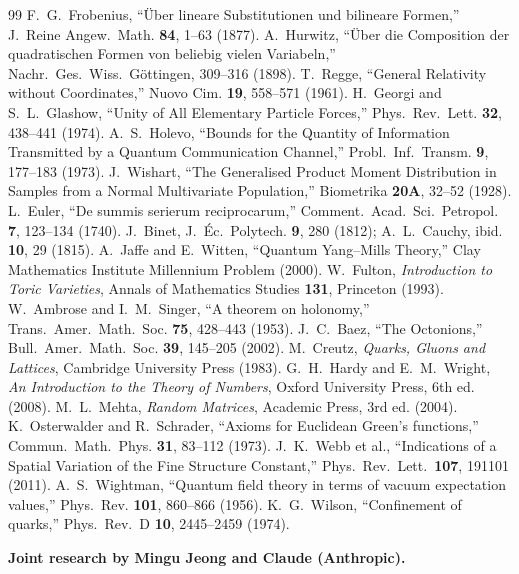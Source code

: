 \documentclass[12pt]{article}
\theoremstyle{remark}
\theoremstyle{definition}
\begin{document}





\begin{thebibliography}{99}
 F.~G.~Frobenius, ``\"Uber lineare Substitutionen und bilineare Formen,'' J.~Reine Angew.~Math. \textbf{84}, 1--63 (1877).
 A.~Hurwitz, ``\"Uber die Composition der quadratischen Formen von beliebig vielen Variabeln,'' Nachr.~Ges.~Wiss.~G\"ottingen, 309--316 (1898).
 T.~Regge, ``General Relativity without Coordinates,'' Nuovo Cim. \textbf{19}, 558--571 (1961).
 H.~Georgi and S.~L.~Glashow, ``Unity of All Elementary Particle Forces,'' Phys.~Rev.~Lett. \textbf{32}, 438--441 (1974).
 A.~S.~Holevo, ``Bounds for the Quantity of Information Transmitted by a Quantum Communication Channel,'' Probl.~Inf.~Transm. \textbf{9}, 177--183 (1973).
 J.~Wishart, ``The Generalised Product Moment Distribution in Samples from a Normal Multivariate Population,'' Biometrika \textbf{20A}, 32--52 (1928).
 L.~Euler, ``De summis serierum reciprocarum,'' Comment.~Acad.~Sci.~Petropol. \textbf{7}, 123--134 (1740).
 J.~Binet, J.~\'Ec.~Polytech. \textbf{9}, 280 (1812); A.~L.~Cauchy, ibid. \textbf{10}, 29 (1815).
 A.~Jaffe and E.~Witten, ``Quantum Yang--Mills Theory,'' Clay Mathematics Institute Millennium Problem (2000).
 W.~Fulton, \textit{Introduction to Toric Varieties}, Annals of Mathematics Studies \textbf{131}, Princeton (1993).
 W.~Ambrose and I.~M.~Singer, ``A theorem on holonomy,'' Trans.~Amer.~Math.~Soc. \textbf{75}, 428--443 (1953).
 J.~C.~Baez, ``The Octonions,'' Bull.~Amer.~Math.~Soc. \textbf{39}, 145--205 (2002).
 M.~Creutz, \textit{Quarks, Gluons and Lattices}, Cambridge University Press (1983).
 G.~H.~Hardy and E.~M.~Wright, \textit{An Introduction to the Theory of Numbers}, Oxford University Press, 6th ed. (2008).
 M.~L.~Mehta, \textit{Random Matrices}, Academic Press, 3rd ed. (2004).
 K.~Osterwalder and R.~Schrader, ``Axioms for Euclidean Green's functions,'' Commun.~Math.~Phys. \textbf{31}, 83--112 (1973).
 J.~K.~Webb et al., ``Indications of a Spatial Variation of the Fine Structure Constant,'' Phys.~Rev.~Lett.\ \textbf{107}, 191101 (2011).
 A.~S.~Wightman, ``Quantum field theory in terms of vacuum expectation values,'' Phys.~Rev. \textbf{101}, 860--866 (1956).
 K.~G.~Wilson, ``Confinement of quarks,'' Phys.~Rev.~D \textbf{10}, 2445--2459 (1974).
\end{thebibliography}

\bigskip
\noindent\textbf{Joint research by Mingu Jeong and Claude (Anthropic).}
\end{document}
